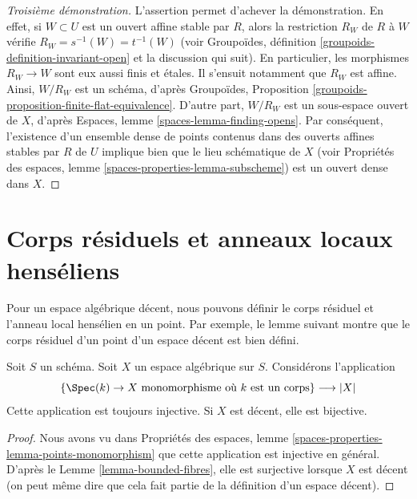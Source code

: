 \begin{proof}[Troisième démonstration]
\medskip\noindent
L'assertion permet d'achever la démonstration. En effet, si $W \subset U$ est
un ouvert affine stable par $R$, alors la restriction $R_W$ de $R$ à $W$
vérifie $R_W = s^{-1}(W) = t^{-1}(W)$ (voir
Groupoïdes, définition \ref{groupoids-definition-invariant-open}
et la discussion qui suit). En particulier, les morphismes $R_W \to W$
sont eux aussi finis et étales. Il s'ensuit notamment que $R_W$ est affine.
Ainsi, $W/R_W$ est un schéma, d'après
Groupoïdes, Proposition \ref{groupoids-proposition-finite-flat-equivalence}.
D'autre part, $W/R_W$ est un sous-espace ouvert de $X$, d'après
Espaces, lemme \ref{spaces-lemma-finding-opens}.
Par conséquent, l'existence d'un ensemble dense de points contenus dans des
ouverts affines stables par $R$ de $U$ implique bien que le lieu schématique
de $X$ (voir Propriétés des espaces, lemme
\ref{spaces-properties-lemma-subscheme}) est un ouvert dense dans $X$.
\end{proof}













\section{Corps résiduels et anneaux locaux henséliens}
\label{section-residue-fields-henselian-local-rings}

\noindent
Pour un espace algébrique décent, nous pouvons définir le corps résiduel et
l'anneau local hensélien en un point. Par exemple, le lemme suivant montre que
le corps résiduel d'un point d'un espace décent est bien défini.

\begin{lemma}
\label{lemma-decent-points-monomorphism}
Soit $S$ un schéma. Soit $X$ un espace algébrique sur $S$.
Considérons l'application
$$
\{\Spec(k) \to X \text{ monomorphisme où }k\text{ est un corps}\}
\longrightarrow
|X|
$$
Cette application est toujours injective. Si $X$ est décent, elle est
bijective.
\end{lemma}

\begin{proof}
Nous avons vu dans
Propriétés des espaces,
lemme \ref{spaces-properties-lemma-points-monomorphism}
que cette application est injective en général.
D'après le Lemme \ref{lemma-bounded-fibres}, elle est surjective lorsque $X$
est décent (on peut même dire que cela fait partie de la définition d'un
espace décent).
\end{proof}

